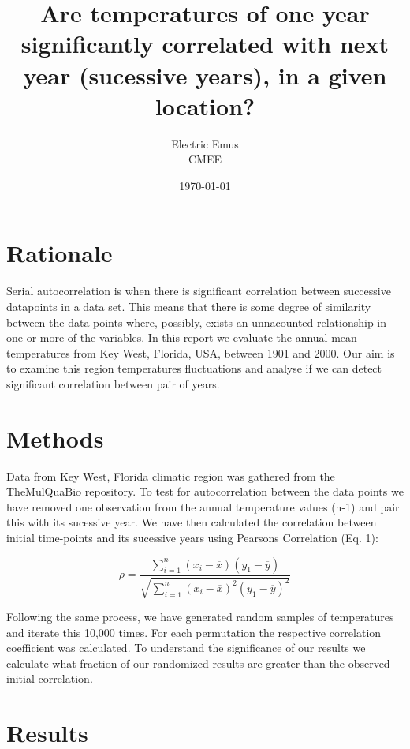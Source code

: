 \documentclass[12pt]{article}
\title{Are temperatures of one year significantly correlated with next year (sucessive years), in a given location?}
\author{Electric Emus \\ CMEE }
\date{\today}
\begin{document}
  \maketitle
  
    \section{Rationale}

    Serial autocorrelation is when there is significant correlation between successive datapoints in a data set. This means that there is some degree of similarity between the data points where, possibly, exists an unnacounted relationship in one or more of the variables.
    In this report we evaluate the annual mean temperatures from Key West, Florida, USA, between 1901 and 2000. Our aim is to examine this region temperatures fluctuations and analyse if we can detect significant correlation between pair of years.
    
  \section{Methods}

    Data from Key West, Florida climatic region was gathered from the TheMulQuaBio \cite{themulquabio_git} repository. 
    To test for autocorrelation between the data points we have removed one observation from the annual temperature values (n-1) and pair this with its sucessive year.
    We have then calculated the correlation between initial time-points and its sucessive years using Pearsons Correlation (Eq. 1):
    
    \begin{equation}
      \rho = \frac{{}\sum_{i=1}^{n} (x_i - \overline{x})(y_1 - \overline{y})}
      {\sqrt{\sum_{i=1}^{n} (x_i - \overline{x})^2(y_1 - \overline{y})^2}}
    \end{equation}
    
    Following the same process, we have generated random samples of temperatures and iterate this 10,000 times. 
    For each permutation the respective correlation coefficient was calculated.
    To understand the significance of our results we calculate what fraction of our randomized results are greater than the observed initial correlation.

  \section{Results}
\end{document}
